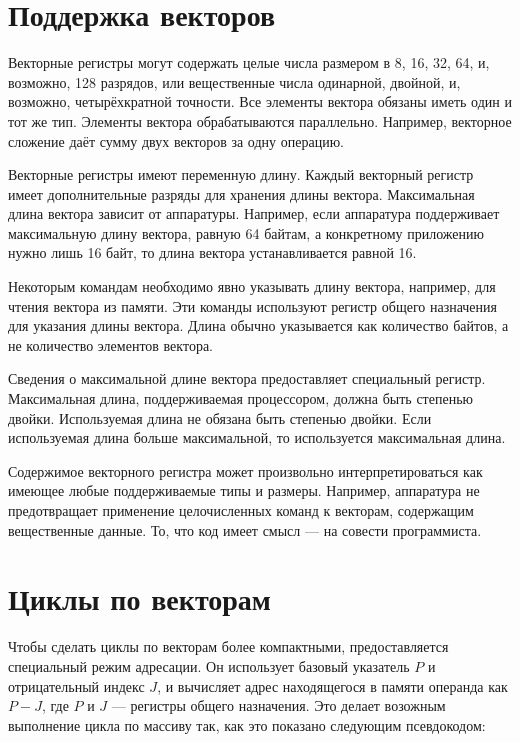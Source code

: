 \documentclass[forwardcom.tex]{subfiles}
\begin{document}
\section{Поддержка векторов}
Векторные регистры могут содержать целые числа размером в 8, 16, 32, 64, и, возможно, 128 разрядов, или вещественные числа одинарной, двойной, и, возможно, четырёхкратной точности. Все элементы вектора обязаны иметь один и тот же тип. Элементы вектора обрабатываются параллельно. Например, векторное сложение даёт сумму двух векторов за одну операцию.

Векторные регистры имеют переменную длину. Каждый векторный регистр имеет дополнительные разряды для хранения длины вектора. Максимальная длина вектора зависит от аппаратуры. Например, если аппаратура поддерживает максимальную длину вектора, равную 64 байтам, а конкретному приложению нужно лишь 16 байт, то длина вектора устанавливается равной 16.

Некоторым командам необходимо явно указывать длину вектора, например, для чтения вектора из памяти. Эти команды используют регистр общего назначения для указания длины вектора. Длина обычно указывается как количество байтов, а не количество элементов вектора.

Сведения о максимальной длине вектора предоставляет специальный регистр. Максимальная длина, поддерживаемая процессором, должна быть степенью двойки. Используемая длина не обязана быть степенью двойки. Если используемая длина больше максимальной, то используется максимальная длина.

Содержимое векторного регистра может произвольно интерпретироваться как имеющее любые поддерживаемые типы и размеры. Например, аппаратура не предотвращает применение целочисленных команд к векторам, содержащим вещественные данные. То, что код имеет смысл --- на совести программиста.

\section{Циклы по векторам} \label{vectorLoops}
Чтобы сделать циклы по векторам более компактными, предоставляется специальный режим адресации. Он использует базовый указатель $P$ и отрицательный индекс $J$, и вычисляет адрес находящегося в памяти операнда как $P-J$, где $P$ и $J$ --- регистры общего назначения. Это делает возожным выполнение цикла по массиву так, как это показано следующим псевдокодом:
\vspace{5mm}

\vspace{5mm}
\end{document}
